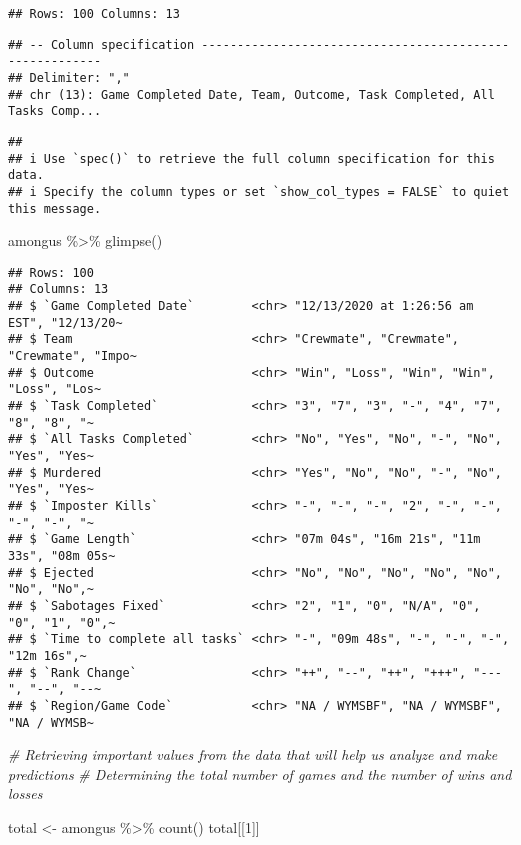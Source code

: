 \documentclass[
]{article}
\newenvironment{Shaded}{\begin{snugshade}}{\end{snugshade}}
\newcommand{\CommentTok}[1]{\textcolor[rgb]{0.56,0.35,0.01}{\textit{#1}}}
\newcommand{\DecValTok}[1]{\textcolor[rgb]{0.00,0.00,0.81}{#1}}
\newcommand{\FunctionTok}[1]{\textcolor[rgb]{0.00,0.00,0.00}{#1}}
\newcommand{\NormalTok}[1]{#1}
\newcommand{\OtherTok}[1]{\textcolor[rgb]{0.56,0.35,0.01}{#1}}
\newcommand{\SpecialCharTok}[1]{\textcolor[rgb]{0.00,0.00,0.00}{#1}}
\begin{document}
\begin{verbatim}
## Rows: 100 Columns: 13
\end{verbatim}

\begin{verbatim}
## -- Column specification --------------------------------------------------------
## Delimiter: ","
## chr (13): Game Completed Date, Team, Outcome, Task Completed, All Tasks Comp...
\end{verbatim}

\begin{verbatim}
## 
## i Use `spec()` to retrieve the full column specification for this data.
## i Specify the column types or set `show_col_types = FALSE` to quiet this message.
\end{verbatim}

\begin{Shaded}
\begin{Highlighting}[]
\NormalTok{amongus }\SpecialCharTok{\%\textgreater{}\%} \FunctionTok{glimpse}\NormalTok{()}
\end{Highlighting}
\end{Shaded}

\begin{verbatim}
## Rows: 100
## Columns: 13
## $ `Game Completed Date`        <chr> "12/13/2020 at 1:26:56 am EST", "12/13/20~
## $ Team                         <chr> "Crewmate", "Crewmate", "Crewmate", "Impo~
## $ Outcome                      <chr> "Win", "Loss", "Win", "Win", "Loss", "Los~
## $ `Task Completed`             <chr> "3", "7", "3", "-", "4", "7", "8", "8", "~
## $ `All Tasks Completed`        <chr> "No", "Yes", "No", "-", "No", "Yes", "Yes~
## $ Murdered                     <chr> "Yes", "No", "No", "-", "No", "Yes", "Yes~
## $ `Imposter Kills`             <chr> "-", "-", "-", "2", "-", "-", "-", "-", "~
## $ `Game Length`                <chr> "07m 04s", "16m 21s", "11m 33s", "08m 05s~
## $ Ejected                      <chr> "No", "No", "No", "No", "No", "No", "No",~
## $ `Sabotages Fixed`            <chr> "2", "1", "0", "N/A", "0", "0", "1", "0",~
## $ `Time to complete all tasks` <chr> "-", "09m 48s", "-", "-", "-", "12m 16s",~
## $ `Rank Change`                <chr> "++", "--", "++", "+++", "---", "--", "--~
## $ `Region/Game Code`           <chr> "NA / WYMSBF", "NA / WYMSBF", "NA / WYMSB~
\end{verbatim}

\begin{Shaded}
\begin{Highlighting}[]
\CommentTok{\# Retrieving important values from the data that will help us analyze and make predictions}
\CommentTok{\# Determining the total number of games and the number of wins and losses}

\NormalTok{total }\OtherTok{\textless{}{-}}\NormalTok{ amongus }\SpecialCharTok{\%\textgreater{}\%} \FunctionTok{count}\NormalTok{()}
\NormalTok{total[[}\DecValTok{1}\NormalTok{]]}
\end{Highlighting}
\end{Shaded}
\end{document}
